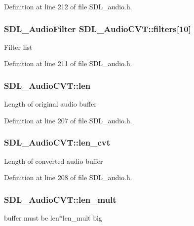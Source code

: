 Definition at line 212 of file S\-D\-L\-\_\-audio.\-h.

\hypertarget{struct_s_d_l___audio_c_v_t_aeec0ebddc5e142bbafcc94a6014ad23e}{
\subsubsection[{filters}]{\setlength{\rightskip}{0pt plus 5cm}S\-D\-L\-\_\-\-Audio\-Filter S\-D\-L\-\_\-\-Audio\-C\-V\-T\-::filters\mbox{[}10\mbox{]}}}\label{struct_s_d_l___audio_c_v_t_aeec0ebddc5e142bbafcc94a6014ad23e}
Filter list 

Definition at line 211 of file S\-D\-L\-\_\-audio.\-h.

\hypertarget{struct_s_d_l___audio_c_v_t_aeaeb8c5a63c3ab96471fbfdf412c78ff}{
\subsubsection[{len}]{ S\-D\-L\-\_\-\-Audio\-C\-V\-T\-::len}}\label{struct_s_d_l___audio_c_v_t_aeaeb8c5a63c3ab96471fbfdf412c78ff}
Length of original audio buffer 

Definition at line 207 of file S\-D\-L\-\_\-audio.\-h.

\hypertarget{struct_s_d_l___audio_c_v_t_a5c60163f34d1947e5b166c23aba9879d}{
\subsubsection[{len\-\_\-cvt}]{ S\-D\-L\-\_\-\-Audio\-C\-V\-T\-::len\-\_\-cvt}}\label{struct_s_d_l___audio_c_v_t_a5c60163f34d1947e5b166c23aba9879d}
Length of converted audio buffer 

Definition at line 208 of file S\-D\-L\-\_\-audio.\-h.

\hypertarget{struct_s_d_l___audio_c_v_t_ac9662d47cf2348b82b27b151150116b0}{
\subsubsection[{len\-\_\-mult}]{ S\-D\-L\-\_\-\-Audio\-C\-V\-T\-::len\-\_\-mult}}\label{struct_s_d_l___audio_c_v_t_ac9662d47cf2348b82b27b151150116b0}
buffer must be len$\ast$len\-\_\-mult big 

